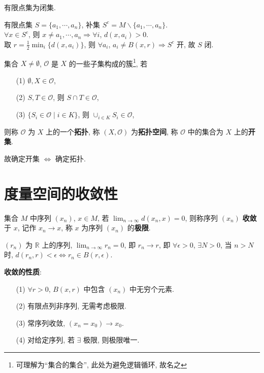 \documentclass{note}
\begin{document}
有限点集为闭集.
\begin{pf}
    有限点集 $S=\{a_1,\cdots,a_n\}$, 补集 $S^{c}=M\backslash\{a_1,\cdots,a_n\}$.\\
    $\forall x\in S^c$, 则 $x\neq a_1,\cdots,a_n\Longrightarrow\forall i$, $d(x,a_i)>0$.\\
    取 $r=\frac{1}{2}\min_i\{d(x,a_i)\}$, 则 $\forall a_i$, $a_i\neq B(x,r)\Longrightarrow S^c$ 开, 故 $S$ 闭.
\end{pf}

\begin{df}[拓扑和拓扑空间]
    集合 $X\neq\emptyset$, $\mathcal{O}$ 是 $X$ 的一些子集构成的簇\footnote{可理解为``集合的集合'', 此处为避免逻辑循环, 故名之}, 若
    \begin{itemize}
        \item[(1)] $\emptyset,X\in\mathcal{O}$,
        \item[(2)] $S,T\in\mathcal{O}$, 则 $S\cap T\in\mathcal{O}$,
        \item[(3)] $\{S_i\in\mathcal{O}\mid i\in K\}$, 则 $\cup_{i\in K}S_i\in\mathcal{O}$,
    \end{itemize}
    则称 $\mathcal{O}$ 为 $X$ 上的一个\textbf{拓扑}, 称 $(X,\mathcal{O})$ 为\textbf{拓扑空间}, 称 $\mathcal{O}$ 中的集合为 $X$ 上的\textbf{开集}.
\end{df}

故确定开集 $\Longleftrightarrow$ 确定拓扑.

\section{度量空间的收敛性}
\begin{df}[收敛和极限]
    集合 $M$ 中序列 $(x_n)$, $x\in M$, 若 $\lim_{n\rightarrow\infty}d(x_n,x)=0$, 则称序列 $(x_n)$ \textbf{收敛}于 $x$, 记作 $x_n\rightarrow x$, 称 $x$ 为序列 $(x_n)$ 的\textbf{极限}.
\end{df}

\begin{eg}
    $(r_n)$ 为 $\mathbb{R}$ 上的序列, $\lim_{n\rightarrow\infty}r_n=0$, 即 $r_n\rightarrow r$, 即 $\forall\epsilon>0$, $\exists N>0$, 当 $n>N$ 时, $d(r_n,r)<\epsilon\Longleftrightarrow r_n\in B(r,\epsilon)$.
\end{eg}

\textbf{收敛的性质}:
\begin{itemize}
    \item[(1)] $\forall r>0$, $B(x,r)$ 中包含 $(x_n)$ 中无穷个元素.
    \item[(2)] 有限点列非序列, 无需考虑极限.
    \item[(3)] 常序列收敛, $(x_n=x_0)\rightarrow x_0$.
    \item[(4)] 对给定序列, 若 $\exists$ 极限, 则极限唯一.
\end{itemize}
\end{document}
